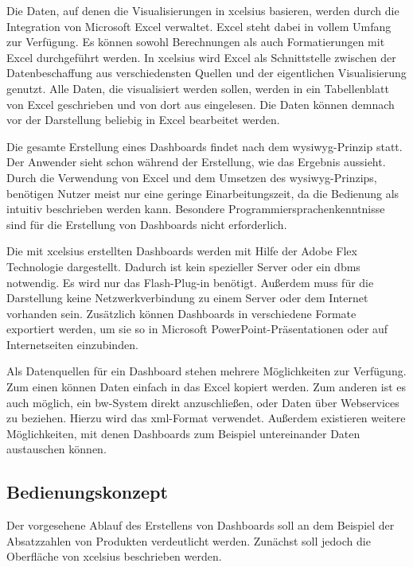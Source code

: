 \begin{onehalfspacing}
Die Daten, auf denen die Visualisierungen in \gls{xcelsius} basieren, werden durch die Integration von Microsoft Excel verwaltet. Excel steht dabei in vollem Umfang zur Verfügung. Es können sowohl Berechnungen als auch Formatierungen mit Excel durchgeführt werden. In \gls{xcelsius} wird Excel als Schnittstelle zwischen der Datenbeschaffung aus verschiedensten Quellen und der eigentlichen Visualisierung genutzt. Alle Daten, die visualisiert werden sollen, werden in ein Tabellenblatt von Excel geschrieben und von dort aus eingelesen. Die Daten können demnach vor der Darstellung beliebig in Excel bearbeitet werden. 

Die gesamte Erstellung eines Dashboards findet nach dem \gls{wysiwyg}-Prinzip statt. Der Anwender sieht schon während der Erstellung, wie das Ergebnis aussieht. Durch die Verwendung von Excel und dem Umsetzen des \gls{wysiwyg}-Prinzips, benötigen Nutzer meist nur eine geringe Einarbeitungszeit, da die Bedienung als intuitiv beschrieben werden kann. Besondere Programmiersprachenkenntnisse sind für die Erstellung von Dashboards nicht erforderlich.

Die mit \gls{xcelsius} erstellten Dashboards werden mit Hilfe der Adobe Flex Technologie dargestellt. Dadurch ist kein spezieller Server oder ein \gls{dbms} notwendig. Es wird nur das Flash-Plug-in benötigt. Außerdem muss für die Darstellung keine Netzwerkverbindung zu einem Server oder dem Internet vorhanden sein. Zusätzlich können Dashboards in verschiedene Formate exportiert werden, um sie so in Microsoft PowerPoint-Präsentationen oder auf Internetseiten einzubinden.

Als Datenquellen für ein Dashboard stehen mehrere Möglichkeiten zur Verfügung. Zum einen können Daten einfach in das Excel kopiert werden. Zum anderen ist es auch möglich, ein \gls{bw}-System direkt anzuschließen, oder Daten über Webservices zu beziehen. Hierzu wird das \gls{xml}-Format verwendet. Außerdem existieren weitere Möglichkeiten, mit denen Dashboards zum Beispiel untereinander Daten austauschen können.

\subsection{Bedienungskonzept}
Der vorgesehene Ablauf des Erstellens von Dashboards soll an dem Beispiel der Absatzzahlen von Produkten verdeutlicht werden. Zunächst soll jedoch die Oberfläche von \gls{xcelsius} beschrieben werden.


\end{onehalfspacing}
